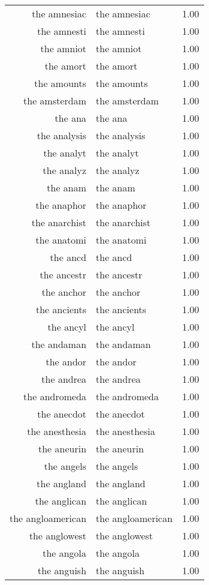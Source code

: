 \begin{table}[ht]
\begin{tabular}{rlr}
  the amnesiac & the amnesiac & 1.00 \\ 
  the amnesti & the amnesti & 1.00 \\ 
  the amniot & the amniot & 1.00 \\ 
  the amort & the amort & 1.00 \\ 
  the amounts & the amounts & 1.00 \\ 
  the amsterdam & the amsterdam & 1.00 \\ 
  the ana & the ana & 1.00 \\ 
  the analysis & the analysis & 1.00 \\ 
  the analyt & the analyt & 1.00 \\ 
  the analyz & the analyz & 1.00 \\ 
  the anam & the anam & 1.00 \\ 
  the anaphor & the anaphor & 1.00 \\ 
  the anarchist & the anarchist & 1.00 \\ 
  the anatomi & the anatomi & 1.00 \\ 
  the ancd & the ancd & 1.00 \\ 
  the ancestr & the ancestr & 1.00 \\ 
  the anchor & the anchor & 1.00 \\ 
  the ancients & the ancients & 1.00 \\ 
  the ancyl & the ancyl & 1.00 \\ 
  the andaman & the andaman & 1.00 \\ 
  the andor & the andor & 1.00 \\ 
  the andrea & the andrea & 1.00 \\ 
  the andromeda & the andromeda & 1.00 \\ 
  the anecdot & the anecdot & 1.00 \\ 
  the anesthesia & the anesthesia & 1.00 \\ 
  the aneurin & the aneurin & 1.00 \\ 
  the angels & the angels & 1.00 \\ 
  the angland & the angland & 1.00 \\ 
  the anglican & the anglican & 1.00 \\ 
  the angloamerican & the angloamerican & 1.00 \\ 
  the anglowest & the anglowest & 1.00 \\ 
  the angola & the angola & 1.00 \\ 
  the anguish & the anguish & 1.00 \\ 

\end{tabular}
\end{table}
